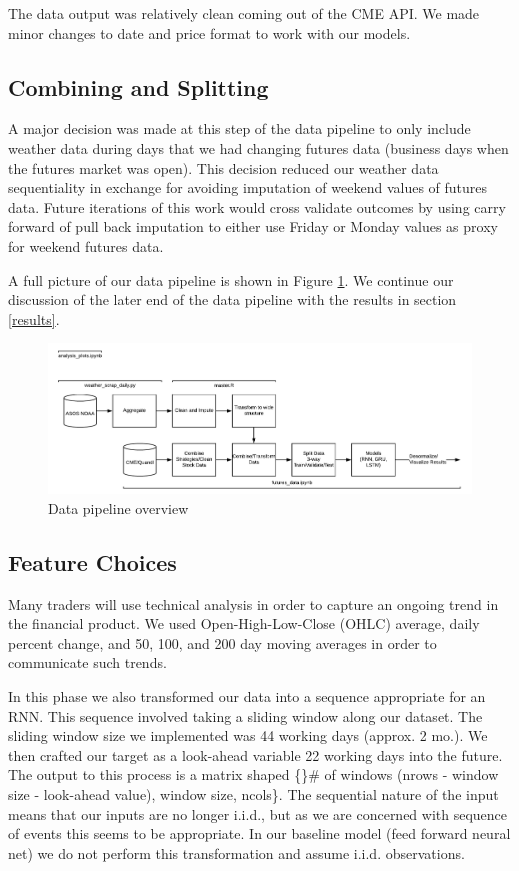 \documentclass[twoside,11pt]{article}
\begin{document}
The data output was relatively clean coming out of the CME API. We made minor changes to date and price format to work with our models.

\subsection{Combining and Splitting}

A major decision was made at this step of the data pipeline to only include weather data during days that we had changing futures data (business days when the futures market was open). This decision reduced our weather data sequentiality in exchange for avoiding imputation of weekend values of futures data. Future iterations of this work would cross validate outcomes by using carry forward of pull back imputation to either use Friday or Monday values as proxy for weekend futures data. 

A full picture of our data pipeline is shown in Figure \ref{fig:datapipeline}. We continue our discussion of the later end of the data pipeline with the results in section \ref{results}.

\begin{figure}[htbp]
	\centering
	\includegraphics[width=6in]{DataPipeline.png}
	\caption{Data pipeline overview}
	\label{fig:datapipeline}
\end{figure}


\subsection{Feature Choices}

Many traders will use technical analysis in order to capture an ongoing trend in the financial product. We used Open-High-Low-Close (OHLC) average, daily percent change, and 50, 100, and 200 day moving averages in order to communicate such trends.  

In this phase we also transformed our data into a sequence appropriate for an RNN. This sequence involved taking a sliding window along our dataset. The sliding window size we implemented was 44 working days (approx. 2 mo.). We then crafted our target as a look-ahead variable 22 working days into the future. The output to this process is a matrix shaped \{\}\# of windows (nrows - window size - look-ahead value), window size, ncols\}. The sequential nature of the input means that our inputs are no longer i.i.d., but as we are concerned with sequence of events this seems to be appropriate. In our baseline model (feed forward neural net) we do not perform this transformation and assume i.i.d. observations. 
\end{document}
